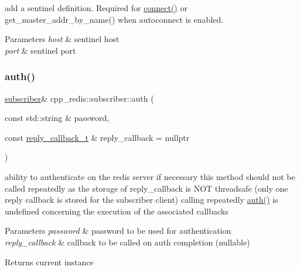 add a sentinel definition. Required for \hyperlink{classcpp__redis_1_1subscriber_a6ae8134a9a9b31d6f2434ec4f6e86d3a}{connect()} or get\+\_\+master\+\_\+addr\+\_\+by\+\_\+name() when autoconnect is enabled.


\begin{DoxyParams}{Parameters}
{\em host} & sentinel host \\
\hline
{\em port} & sentinel port \\
\hline
\end{DoxyParams}
\mbox{\label{classcpp__redis_1_1subscriber_a7b4564fc4dfe356b95aeae4fdb8071c9}} 
\subsubsection{\texorpdfstring{auth()}{auth()}}
{\footnotesize\ttfamily \hyperlink{classcpp__redis_1_1subscriber}{subscriber}\& cpp\+\_\+redis\+::subscriber\+::auth (\begin{DoxyParamCaption}\item[{const std\+::string \&}]{password,  }\item[{const \hyperlink{classcpp__redis_1_1subscriber_a99d220cc662664e2399b709f61ac9581}{reply\+\_\+callback\+\_\+t} \&}]{reply\+\_\+callback = {\ttfamily nullptr} }\end{DoxyParamCaption})}

ability to authenticate on the redis server if necessary this method should not be called repeatedly as the storage of reply\+\_\+callback is N\+OT threadsafe (only one reply callback is stored for the subscriber client) calling repeatedly \hyperlink{classcpp__redis_1_1subscriber_a7b4564fc4dfe356b95aeae4fdb8071c9}{auth()} is undefined concerning the execution of the associated callbacks


\begin{DoxyParams}{Parameters}
{\em password} & password to be used for authentication \\
\hline
{\em reply\+\_\+callback} & callback to be called on auth completion (nullable) \\
\hline
\end{DoxyParams}
\begin{DoxyReturn}{Returns}
current instance 
\end{DoxyReturn}
\mbox{\label{classcpp__redis_1_1subscriber_a6d5bdcf7c5a67d1b56b021bbd450a7c3}} 
